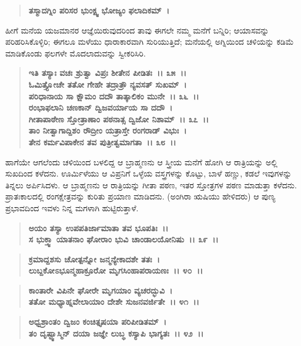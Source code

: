 \begin{verse}
\textbf{ತಸ್ಮಾದಗ್ನಿಂ ಪರಿಸರ ಭುಂಕ್ಷ್ವ ಭೋಜ್ಯಂ ಫಲಾದಿಕಮ್~।}
\end{verse}

ಹೀಗೆ ಮನೆಯ ಯಜಮಾನರ ಆಜ್ಞೆಯಿರುವುದರಿಂದ ತಾವು ಈಗಲೇ ನಮ್ಮ ಮನೆಗೆ ಬನ್ನಿರಿ; ಆಯಾಸವನ್ನು ಪರಿಹರಿಸಿಕೊಳ್ಳಿರಿ; ಈಗಲೂ ಮಳೆಯು ಧಾರಾಕಾರವಾಗಿ ಸುರಿಯು\-ತ್ತಿದೆ; ಮನೆಯಲ್ಲಿ ಅಗ್ನಿಯಿಂದ ಚಳಿಯನ್ನು ಕಡಿಮೆ ಮಾಡಿಕೊಂಡು ಫಲಗಳೇ ಮೊದಲಾದುವನ್ನು ಸ್ವೀಕರಿಸಿರಿ.

\begin{verse}
\textbf{ಇತಿ ತಸ್ಯಾಃ ವಚಃ ಶ್ರುತ್ವಾ ವಿಪ್ರಃ ಶೀತೇನ ಪೀಡಿತಃ~।। ೩೫~।।}\\\textbf{ಓಮಿತ್ತ್ಯೋಚೇ ತತೋ ಗೇಹೇ ತದ್ರಾತ್ರೌ ನ್ಯವಸತ್ ಸುಖಮ್~। }\\\textbf{ಪರಿಧಾನಾಯ ಸಾ ಕ್ಷೌಮಂ ದದೌ ತಾತ್ಕಾಲಿಕಂ ಮುನೇ~।। ೩೬~।।}\\\textbf{ರಂಭಾಫಲಾನಿ ಚಣಕಾನ್ ದ್ವಿಜವರ್ಯಾಯ ಸಾ ದದೌ~। }\\\textbf{ಗೀತಾಪಾಠೇಣ ಸ್ತೋತ್ರಾಣಾಂ ಪಠನಾತ್ಸ ದ್ವಿಜೋ ನಿಶಾಮ್~।। ೩೭~।।} \\\textbf{ತಾಂ ನೀತ್ವಾಗಾದ್ದಿಶಂ ರೌದ್ರೀಂ ಯತ್ರಾಸ್ತೇ ರಂಗರಾಡ್ ವಿಭುಃ~। }\\\textbf{ತೇನ ಕರ್ಮವಿಪಾಕೇನ ತವ ಪುತ್ರೀತ್ವಮಾಗತಾ~।। ೩೮~।।}
\end{verse}

ಹಾಗೆಯೇ ಆಗಲೆಂದು ಚಳಿಯಿಂದ ಬಳಲಿದ್ದ ಆ ಬ್ರಾಹ್ಮಣನು ಆ ಸ್ತ್ರೀಯ ಮನೆಗೆ ಹೋಗಿ ಆ ರಾತ್ರಿಯನ್ನು ಅಲ್ಲಿ ಸುಖದಿಂದ ಕಳೆದನು. ಊರ್ಮಿಳೆಯು ಆ ವಿಪ್ರನಿಗೆ ಒಳ್ಳೆಯ ವಸ್ತ್ರಗಳನ್ನು ಕೊಟ್ಟು, ಬಾಳೆ ಹಣ್ಣು, ಕಡಲೆ ಇವುಗಳನ್ನು ತಿನ್ನಲು ಅರ್ಪಿಸಿದಳು. ಆ ಬ್ರಾಹ್ಮಣನು ಆ ರಾತ್ರಿಯನ್ನು ಗೀತಾ ಪಠಣ, ಇತರ ಸ್ತೋತ್ರಗಳ ಪಠಣ ಮಾಡುತ್ತಾ ಕಳೆದನು. ಪ್ರಾತಃಕಾಲದಲ್ಲಿ ರಂಗಕ್ಷೇತ್ರವನ್ನು ಕುರಿತು ಪ್ರಯಾಣ ಮಾಡಿದನು. (ಅಂಗಿರಾ ಋಷಿಯು ಹೇಳಿದರು) ಆ ಪುಣ್ಯ ಪ್ರಭಾವದಿಂದ ಇವಳು ನಿನ್ನ ಮಗಳಾಗಿ ಹುಟ್ಟಿರುತ್ತಾಳೆ.

\begin{verse}
\textbf{ಅಯಂ ತಸ್ಯಾ ಉಪಪತಿರ್ಜಾಮಾತಾ ತವ ಭೂಪತಿಃ~।।}\\\textbf{ಸ ಭುಕ್ತ್ವಾ ಯಾತನಾಂ ಘೋರಾಂ ಭುವಿ ಚಾಂಡಾಲಯೋನಿಷು~।। ೩೯~।।}
\end{verse}

\begin{verse}
\textbf{ಕ್ರಮಾದ್ದಶಸು ಚೋತ್ಪನ್ನೋ ಜನ್ಮನ್ಯೇಕಾದಶೇ ತತಃ~।}\\\textbf{ಲುಬ್ದಕೋಽಭೂನ್ಮಹಾಕ್ರೂರೋ ಮೃಗಸಿಂಹಾಪರಾಯಣಃ~।। ೪೦~।। }
\end{verse}

\begin{verse}
\textbf{ಕಾಂತಾರೇ ವಿಪಿನೇ ಘೋರೇ ಮೃಗಯಾಂ ವ್ಯಚರದ್ಭುವಿ~।}\\\textbf{ತತೋ ಮಧ್ಯಾಹ್ನವೇಲಾಯಾಂ ದೇಶೇ ಸುಜನವರ್ಜಿತೇ~।। ೪೧~।। }
\end{verse}

\begin{verse}
\textbf{ಅಧ್ವಶ್ರಾಂತಂ ದ್ವಿಜಂ ಕಂಚಿತ್ತೃಷಯಾ ಪರಿಪೀಡಿತಮ್~।}\\\textbf{ತಂ ದೃಷ್ಟ್ವಾಸ್ಮಿನ್ ದಯಾ ಜಜ್ಞೇ ಲುಬ್ಧ ಕಸ್ಯಾಪಿ ಭಾಗ್ಯತಃ~।। ೪೨~।।}
\end{verse}

